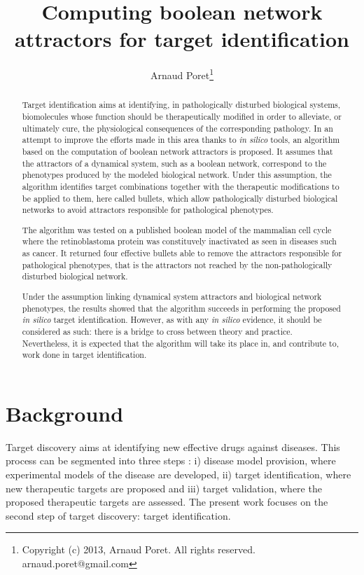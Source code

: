 \documentclass[oneside,a4paper,onecolumn,notitlepage]{article}
\title{Computing boolean network attractors for target identification}
\author{Arnaud Poret\footnote{Copyright (c) 2013, Arnaud Poret. All rights reserved. arnaud.poret@gmail.com}}
\date{}
\begin{document}
\maketitle
\tableofcontents

\begin{abstract}
Target identification aims at identifying, in pathologically disturbed biological systems, biomolecules whose function should be therapeutically modified in order to alleviate, or ultimately cure, the physiological consequences of the corresponding pathology. In an attempt to improve the efforts made in this area thanks to \textit{in silico} tools, an algorithm based on the computation of boolean network attractors is proposed. It assumes that the attractors of a dynamical system, such as a boolean network, correspond to the phenotypes produced by the modeled biological network. Under this assumption, the algorithm identifies target combinations together with the therapeutic modifications to be applied to them, here called bullets, which allow pathologically disturbed biological networks to avoid attractors responsible for pathological phenotypes.

The algorithm was tested on a published boolean model of the mammalian cell cycle where the retinoblastoma protein was constituvely inactivated as seen in diseases such as cancer. It returned four effective bullets able to remove the attractors responsible for pathological phenotypes, that is the attractors not reached by the non-pathologically disturbed biological network.

Under the assumption linking dynamical system attractors and biological network phenotypes, the results showed that the algorithm succeeds in performing the proposed \textit{in silico} target identification. However, as with any \textit{in silico} evidence, it should be considered as such: there is a bridge to cross between theory and practice. Nevertheless, it is expected that the algorithm will take its place in, and contribute to, work done in target identification.
\end{abstract}

\section*{Background}
Target discovery aims at identifying new effective drugs against diseases. This process can be segmented into three steps \cite{lindsay2003target}: i) disease model provision, where experimental models of the disease are developed, ii) target identification, where new therapeutic targets are proposed and iii) target validation, where the proposed therapeutic targets are assessed. The present work focuses on the second step of target discovery: target identification.
\end{document}
